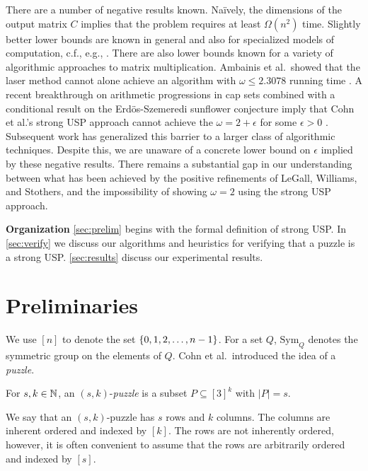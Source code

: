 \documentclass[11pt]{article}
\newcommand\sse{\subseteq}
\newcommand\Sym[1]{\ensuremath{\mathrm{Sym}_{#1}}}
\begin{document}
There are a number of negative results known.  Na\"{i}vely, the
dimensions of the output matrix $C$ implies that the problem requires at
least $\Omega(n^2)$ time.  Slightly better lower bounds are known in
general and also for specialized models of computation, c.f., e.g.,
\cite{shp03,kam05}.  There are also lower bounds known for a variety
of algorithmic approaches to matrix multiplication.  Ambainis et
al.~showed that the laser method cannot alone achieve an algorithm
with $\omega \le 2.3078$ running time \cite{afl15}.  A recent
breakthrough on arithmetic progressions in cap sets \cite{clp17} combined
with a conditional result on the Erd\"{o}s-Szemeredi sunflower
conjecture \cite{asu13} imply that Cohn et al.'s strong USP approach cannot achieve the $\omega = 2 + \epsilon$
for some $\epsilon > 0$ \cite{bccgu16}.  Subsequent work has
generalized this barrier \cite{avw18a,avw18b} to a larger class of
algorithmic techniques.  Despite this, we are unaware of a concrete
lower bound on $\epsilon$ implied by these negative results.  There
remains a substantial gap in our understanding between what has been
achieved by the positive refinements of LeGall, Williams, and
Stothers, and the impossibility of showing $\omega = 2$ using the
strong USP approach.

\smallskip
\noindent\textbf{Organization} \autoref{sec:prelim} begins with the formal definition of strong USP.
In \autoref{sec:verify} we discuss our algorithms and heuristics for verifying that a
puzzle is a strong USP.  \autoref{sec:results} discuss our experimental results.


\section{Preliminaries}
\label{sec:prelim}

\newcommand\ordset[1]{\ensuremath{[#1]}}

We use $\ordset{n}$ to denote the set $\left\{ 0,1,2,\ldots, n-1 \right\}$.  For
a set $Q$, $\Sym{Q}$ denotes the symmetric group on the elements of
$Q$.
Cohn et al.~introduced the idea of a \emph{puzzle}.
\begin{definition}[Puzzle]
  For $s, k \in \mathbb{N}$, an $(s,k)$-\emph{puzzle} is a
  subset $P \sse \ordset{3}^k$ with $|P| = s$.
\end{definition}
\noindent We say that an $(s,k)$-puzzle has $s$ rows and $k$ columns.  The
columns are inherent ordered and indexed by $\ordset{k}$.  The rows
are not inherently ordered, however, it is often convenient to assume
that the rows are arbitrarily ordered and indexed by $\ordset{s}$.
\end{document}
